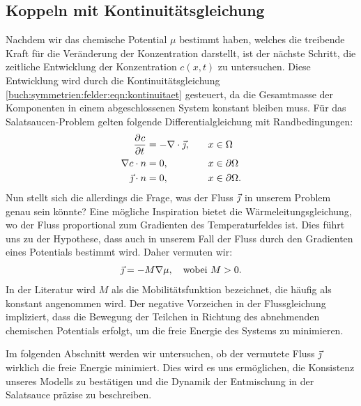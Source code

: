 \subsection{Koppeln mit Kontinuitätsgleichung}
Nachdem wir das chemische Potential $\mu$ bestimmt haben,
welches die treibende Kraft für die Veränderung der Konzentration darstellt,
ist der nächste Schritt,
die zeitliche Entwicklung der Konzentration $c(x,t)$ zu untersuchen.
Diese Entwicklung wird durch die Kontinuitätsgleichung
\eqref{buch:symmetrien:felder:eqn:kontinuitaet} gesteuert,
da die Gesamtmasse der Komponenten in einem abgeschlossenen System konstant bleiben muss.
Für das Salatsaucen-Problem gelten folgende Differentialgleichung mit Randbedingungen:
\begin{align}
\begin{aligned}
\frac{\partial^{} c}{\partial t^{}}
&=
- \nabla \cdot {\vec{\jmath}}
,\quad&
x &\in \Omega
\\
\nabla c \cdot n
&=
0
,&
x &\in \partial\Omega
\\
{\vec{\jmath}} \cdot n
&=
0
,&
x &\in \partial\Omega
.
\end{aligned}
\label{cahnhilliard:continuity}
\end{align}
Nun stellt sich die allerdings die Frage,
was der Fluss ${\vec{\jmath}}$ \;in unserem Problem genau sein könnte?
Eine mögliche Inspiration bietet die Wärmeleitungsgleichung,
wo der Fluss proportional zum Gradienten des Temperaturfeldes ist.
Dies führt uns zu der Hypothese, dass auch in unserem Fall der Fluss
durch den Gradienten eines Potentials bestimmt wird.
Daher vermuten wir:
\begin{align*}
{\vec{\jmath}}
=
- M \nabla \mu
,\quad\text{wobei } M > 0
.
\end{align*}
In der Literatur wird $M$ als die Mobilitätsfunktion bezeichnet,
%
die häufig als konstant angenommen wird.
Der negative Vorzeichen in der Flussgleichung impliziert,
dass die Bewegung der Teilchen in Richtung des abnehmenden chemischen Potentials erfolgt,
um die freie Energie des Systems zu minimieren.

Im folgenden Abschnitt werden wir untersuchen,
ob der vermutete Fluss ${\vec{\jmath}}{}$ \;wirklich die freie Energie minimiert.
Dies wird es uns ermöglichen,
die Konsistenz unseres Modells zu bestätigen und
die Dynamik der Entmischung in der Salatsauce präzise zu beschreiben.

